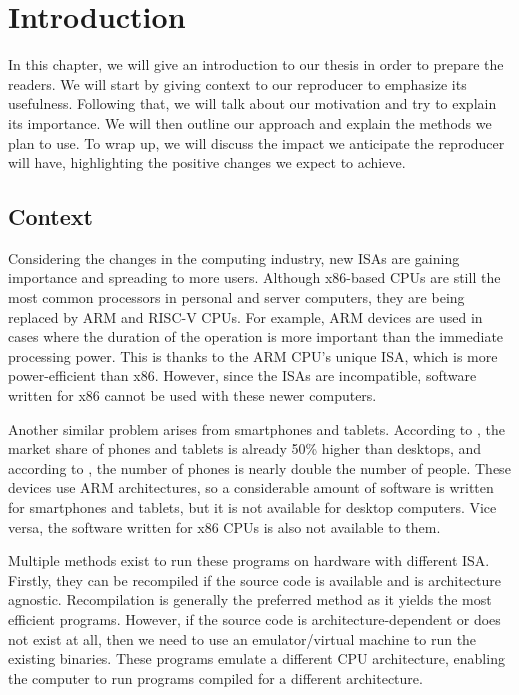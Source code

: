 
\chapter{Introduction}\label{chapter:introduction}
In this chapter, we will give an introduction to our thesis in order to prepare the readers.
We will start by giving context to our reproducer to emphasize its usefulness.
Following that, we will talk about our motivation and try to explain its importance. 
We will then outline our approach and explain the methods we plan to use. 
To wrap up, we will discuss the impact we anticipate the reproducer will have, highlighting the positive changes we expect to achieve.


\section{Context}
Considering the changes in the computing industry, new \ac{ISA}s are gaining importance and spreading to more users.
Although x86-based CPUs are still the most common processors in personal and server computers, they are being replaced by ARM and RISC-V CPUs.
For example, ARM devices are used in cases where the duration of the operation is more important than the immediate processing power.
This is thanks to the ARM CPU's unique \ac{ISA}, which is more power-efficient than x86.
However, since the \ac{ISA}s are incompatible, software written for x86 cannot be used with these newer computers.

Another similar problem arises from smartphones and tablets.
According to \cite{statscounter}, the market share of phones and tablets is already 50\% higher than desktops, and according to \cite{radicati}, the number of phones is nearly double the number of people.
These devices use ARM architectures, so a considerable amount of software is written for smartphones and tablets, but it is not available for desktop computers.
Vice versa, the software written for x86 CPUs is also not available to them.

Multiple methods exist to run these programs on hardware with different \ac{ISA}.
Firstly, they can be recompiled if the source code is available and is architecture agnostic.
Recompilation is generally the preferred method as it yields the most efficient programs.
However, if the source code is architecture-dependent or does not exist at all, then we need to use an emulator/virtual machine to run the existing binaries.
These programs emulate a different CPU architecture, enabling the computer to run programs compiled for a different architecture. 


